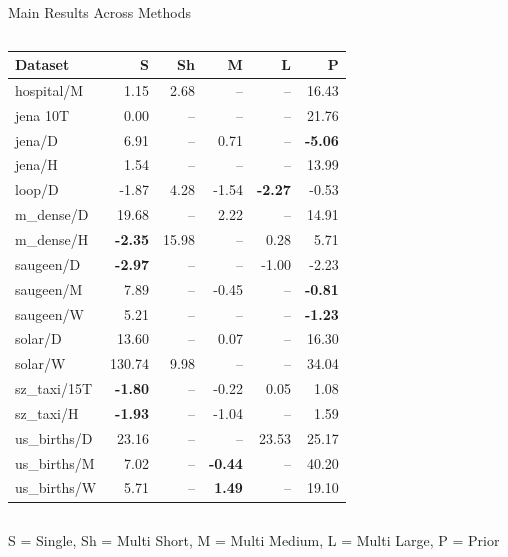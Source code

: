 \documentclass[t,aspectratio=169,svgnames]{beamer}
\begin{document}
\begin{frame}{Main Results Across Methods}
\begin{columns}[T]

\centering

\begin{tabular}{lrrrrr}
\toprule
Dataset & S & Sh & M & L & P \\
\midrule
hospital/M & \cellcolor{yellow}1.15 & 2.68 & -- & -- & 16.43 \\
jena 10T & \cellcolor{yellow}0.00 & -- & -- & -- & 21.76 \\
jena/D & 6.91 & -- & 0.71 & -- & \cellcolor{yellow}\textbf{-5.06} \\
jena/H & \cellcolor{yellow}1.54 & -- & -- & -- & 13.99 \\
loop/D & -1.87 & 4.28 & -1.54 & \cellcolor{yellow}\textbf{-2.27} & -0.53 \\
m\_dense/D & 19.68 & -- & \cellcolor{yellow}2.22 & -- & 14.91 \\
m\_dense/H & \cellcolor{yellow}\textbf{-2.35} & 15.98 & -- & 0.28 & 5.71 \\
saugeen/D & \cellcolor{yellow}\textbf{-2.97} & -- & -- & -1.00 & -2.23 \\
saugeen/M & 7.89 & -- & -0.45 & -- & \cellcolor{yellow}\textbf{-0.81} \\
saugeen/W & 5.21 & -- & -- & -- & \cellcolor{yellow}\textbf{-1.23} \\
solar/D & 13.60 & -- & \cellcolor{yellow}0.07 & -- & 16.30 \\
solar/W & 130.74 & \cellcolor{yellow}9.98 & -- & -- & 34.04 \\
sz\_taxi/15T & \cellcolor{yellow}\textbf{-1.80} & -- & -0.22 & 0.05 & 1.08 \\
sz\_taxi/H & \cellcolor{yellow}\textbf{-1.93} & -- & -1.04 & -- & 1.59 \\
us\_births/D & \cellcolor{yellow}23.16 & -- & -- & 23.53 & 25.17 \\
us\_births/M & 7.02 & -- & \cellcolor{yellow}\textbf{-0.44} & -- & 40.20 \\
us\_births/W & 5.71 & -- & \cellcolor{yellow}\textbf{1.49} & -- & 19.10 \\
\bottomrule
\end{tabular}

\end{columns}

\vspace{0.2cm}

{\tiny
S = Single, Sh = Multi Short, M = Multi Medium, L = Multi Large, P = Prior
}

\end{frame}
\end{document}
